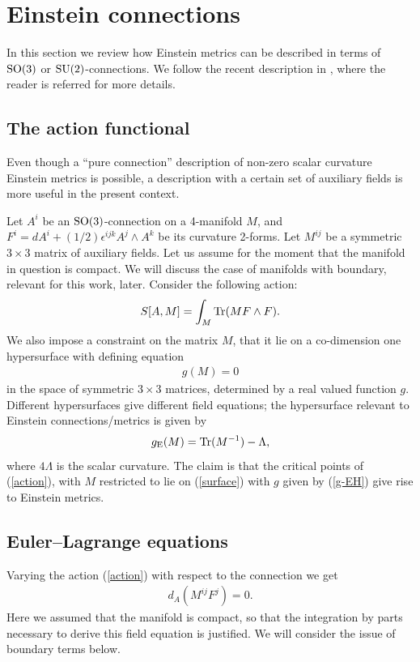\documentclass[a4paper,12pt]{article}
\newcommand{\be}{\begin{eqnarray}}
\newcommand{\ee}{\end{eqnarray}}
\begin{document}
\section{Einstein connections}
\label{sec:theory}

In this section we review how Einstein metrics can be described in terms of ${\rm SO}(3)$ or ${\rm SU}(2)$-connections. We follow the recent description in \cite{Herfray:2015fpa}, where the reader is referred for more details. 

\subsection{The action functional}

Even though a ``pure connection'' description of non-zero scalar curvature Einstein metrics is possible, a description with a certain set of auxiliary fields is more useful in the present context. 

Let $A^i$ be an ${\rm SO}(3)$-connection on a 4-manifold $M$, and $F^i = dA^i + (1/2) \epsilon^{ijk} A^j\wedge A^k$ be its curvature 2-forms. Let $M^{ij}$ be a symmetric $3\times 3$ matrix of auxiliary fields. Let us assume for the moment that the manifold in question is compact. We will discuss the case of manifolds with boundary, relevant for this work, later. Consider the following action:
\be\label{action}
S[A,M] = \int_M {\rm Tr}( M F\wedge F).
\ee
We also impose a constraint on the matrix $M$, that it lie on a co-dimension one hypersurface with defining equation
\be\label{surface}
g(M)=0
\ee
in the space of symmetric $3\times 3$ matrices, determined by a real valued function $g$. Different hypersurfaces give different field equations; the hypersurface relevant to Einstein connections/metrics is given by
\be\label{g-EH}
g_{\rm E}(M) = {\rm Tr}(M^{-1}) - \Lambda,
\ee
where $4\Lambda$ is the scalar curvature. The claim is that the critical points of (\ref{action}), with $M$ restricted to lie on (\ref{surface}) with $g$ given by (\ref{g-EH}) give rise to Einstein metrics.

\subsection{Euler--Lagrange equations}

Varying the action (\ref{action}) with respect to the connection we get
\be\label{eq-A}
d_A \left( M^{ij} F^j \right) =0.
\ee
Here we assumed that the manifold is compact, so that the integration by parts necessary to derive this field equation is justified. We will consider the issue of boundary terms below. 
\end{document}
